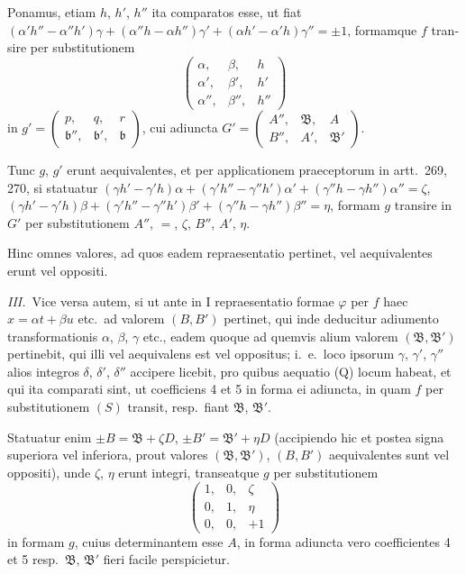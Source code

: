 \documentclass[12pt,a4paper]{article}
\theoremstyle{plain}
\theoremstyle{definition}
\theoremstyle{remark}
\begin{document}
\begin{otherlanguage}{latin}
Ponamus, etiam $h$, $h'$, $h''$ ita comparatos esse, ut fiat $(\alpha'h'' - \alpha''h')\gamma + (\alpha''h - \alpha h'')\gamma' + (\alpha h' - \alpha'h)\gamma'' = \pm 1$, formamque $f$ transire per substitutionem
\[
\begin{pmatrix} \alpha, & \beta, & h \\ \alpha', & \beta', & h' \\ \alpha'', & \beta'', & h'' \end{pmatrix}
\]
in $g' = \begin{pmatrix} p, & q, & r \\ \mathfrak{b}'', & \mathfrak{b}', & \mathfrak{b} \end{pmatrix}$, cui adiuncta $G' = \begin{pmatrix} A'', & \mathfrak{B}, & A \\ B'', & A', & \mathfrak{B}' \end{pmatrix}$.

Tunc $g$, $g'$ erunt aequivalentes, et per applicationem praeceptorum in artt.\ 269, 270, si statuatur $(\gamma h' - \gamma' h)\alpha + (\gamma' h'' - \gamma'' h')\alpha' + (\gamma'' h - \gamma h'')\alpha'' = \zeta$, $(\gamma h' - \gamma' h)\beta + (\gamma' h'' - \gamma'' h')\beta' + (\gamma'' h - \gamma h'')\beta'' = \eta$, formam $g$ transire in $G'$ per substitutionem $A''$, $=$, $\zeta$, $B''$, $A'$, $\eta$.

Hinc omnes valores, ad quos eadem repraesentatio pertinet, vel aequivalentes erunt vel oppositi.

\textit{III.}\ Vice versa autem, si ut ante in I repraesentatio formae $\varphi$ per $f$ haec $x = \alpha t + \beta u$ etc.\ ad valorem $(B, B')$ pertinet, qui inde deducitur adiumento transformationis $\alpha$, $\beta$, $\gamma$ etc., eadem quoque ad quemvis alium valorem $(\mathfrak{B}, \mathfrak{B}')$ pertinebit, qui illi vel aequivalens est vel oppositus; i.\ e.\ loco ipsorum $\gamma$, $\gamma'$, $\gamma''$ alios integros $\delta$, $\delta'$, $\delta''$ accipere licebit, pro quibus aequatio (Q) locum habeat, et qui ita comparati sint, ut coefficiens 4 et 5 in forma ei adiuncta, in quam $f$ per substitutionem $(S)$ transit, resp.\ fiant $\mathfrak{B}$, $\mathfrak{B}'$.

Statuatur enim $\pm B = \mathfrak{B} + \zeta D$, $\pm B' = \mathfrak{B}' + \eta D$ (accipiendo hic et postea signa superiora vel inferiora, prout valores $(\mathfrak{B}, \mathfrak{B}')$, $(B, B')$ aequivalentes sunt vel oppositi), unde $\zeta$, $\eta$ erunt integri, transeatque $g$ per substitutionem
\[
\begin{pmatrix} 1, & 0, & \zeta \\ 0, & 1, & \eta \\ 0, & 0, & +1 \end{pmatrix}
\]
in formam $g$, cuius determinantem esse $A$, in forma adiuncta vero coefficientes 4 et 5 resp.\ $\mathfrak{B}$, $\mathfrak{B}'$ fieri facile perspicietur.


\end{otherlanguage}
\end{document}
